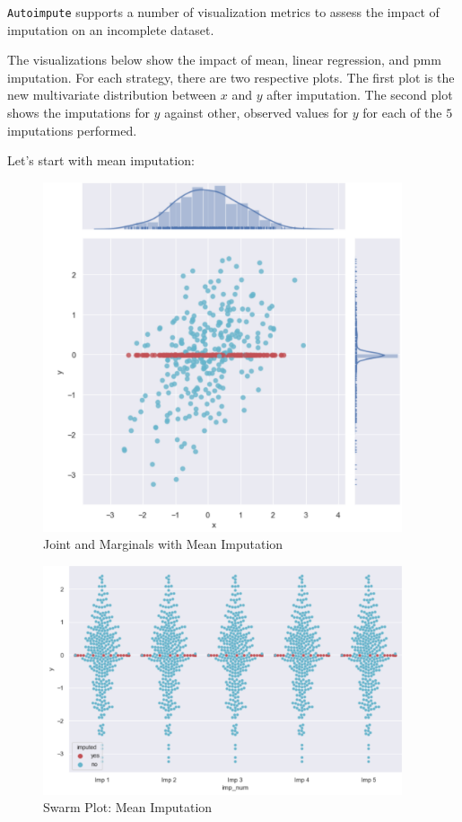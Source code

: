 \documentclass[12pt,oneside]{chicagocapstone}
\begin{document}
\texttt{Autoimpute} supports a number of visualization metrics to assess
the impact of imputation on an incomplete dataset.

The visualizations below show the impact of mean, linear regression, and
pmm imputation. For each strategy, there are two respective plots. The
first plot is the new multivariate distribution between \(x\) and \(y\)
after imputation. The second plot shows the imputations for \(y\)
against other, observed values for \(y\) for each of the \(5\)
imputations performed.

Let's start with mean imputation:
\begin{figure}

{\centering \includegraphics[width=400px]{figure/multi-mean} 

}

\caption{Joint and Marginals with Mean Imputation}\label{fig:multi-mean}
\end{figure}
\begin{figure}

{\centering \includegraphics[width=400px]{figure/swarm-mean} 

}

\caption{Swarm Plot: Mean Imputation}\label{fig:swarm-mean}
\end{figure}
\end{document}
